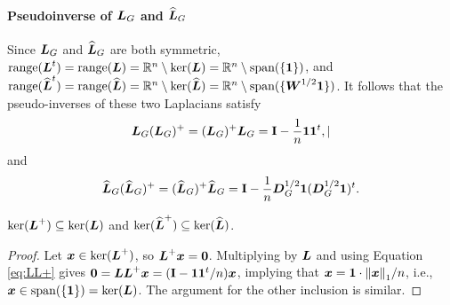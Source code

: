 \paragraph{Pseudoinverse of \texorpdfstring{$\vb*{L}_G$}{the combinatorial} and \texorpdfstring{$\widehat{\vb*{L}}_G$}{normalized Laplacian.}}
Since $\vb*{L}_G$ and $\widehat{\vb*{L}}_G$ are both symmetric, $\textnormal{range}(\vb*{L}^t)=\textnormal{range}(\vb*{L})=\mathbb{R}^n \setminus \ker(\vb*{L})=\mathbb{R}^n \setminus \textnormal{span}(\{\vb{1}\})$, and $\textnormal{range}(\widehat{\vb*{L}}^t)=\textnormal{range}(\widehat{\vb*{L}})=\mathbb{R}^n \setminus \ker(\widehat{\vb*{L}})=\mathbb{R}^n \setminus \textnormal{span}(\{\vb*{W}^{1/2}\vb{1}\})$. It follows that the pseudo-inverses of these two Laplacians satisfy
\begin{equation}
\vb*{L}_G(\vb*{L}_G)^+ = (\vb*{L}_G)^+\vb*{L}_G = \vb{I} - \frac{1}{n}\vb{1}\vb{1}^t,\label{eq:LL+}|
\end{equation}
and 
\begin{equation*}
\widehat{\vb*{L}}_G(\widehat{\vb*{L}}_G)^+ = (\widehat{\vb*{L}}_G)^+\widehat{\vb*{L}}_G = \vb{I} - \frac{1}{n}\vb*{D}_G^{1/2}\vb{1}(\vb*{D}_G^{1/2}\vb{1})^t.
\end{equation*}

\begin{lemma}
	$\ker(\vb*{L}^+)\subseteq\ker(\vb*{L})$ and $\ker(\widehat{\vb*{L}}^+)\subseteq\ker(\widehat{\vb*{L}})$.  
\end{lemma}
\begin{proof}
	Let $\vb*{x}\in\ker(\vb*{L}^+)$, so $\vb*{L}^+\vb*{x}=\vb{0}$. Multiplying by $\vb*{L}$ and using Equation \eqref{eq:LL+} gives $\vb{0}=\vb*{L}\vb*{L}^+\vb*{x}=(\vb{I}-\vb{1}\vb{1}^t/n)\vb*{x}$, implying that $\vb*{x}=\vb{1} \cdot \norm{\vb*{x}}_1/n$, i.e., $\vb*{x}\in\textnormal{span}(\{\vb{1}\})=\ker(\vb*{L})$. The argument for the other inclusion is similar.
\end{proof}





